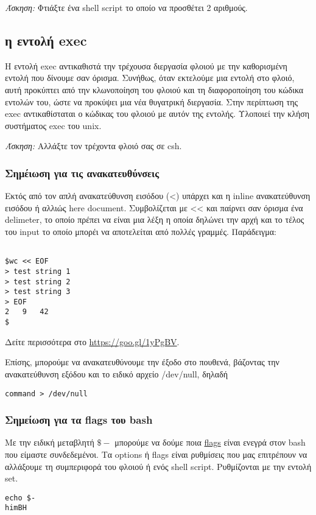 \emph{Άσκηση:} Φτιάξτε ένα shell script το οποίο να προσθέτει 2 αριθμούς.

\subsection*{η εντολή exec}

Η εντολή exec αντικαθιστά την τρέχουσα διεργασία φλοιού με την καθορισμένη εντολή που δίνουμε σαν όρισμα. Συνήθως, όταν εκτελούμε μια
εντολή στο φλοιό, αυτή προκύπτει από την κλωνοποίηση του φλοιού και τη διαφοροποίηση του κώδικα εντολών του, ώστε να προκύψει μια νέα
θυγατρική διεργασία. Στην περίπτωση της exec αντικαθίσταται ο κώδικας του φλοιού με αυτόν της εντολής. Υλοποιεί την κλήση συστήματος exec
του unix.

\emph{Άσκηση:} Αλλάξτε τον τρέχοντα φλοιό σας σε csh.

\subsubsection{Σημέιωση για τις ανακατευθύνσεις}

Εκτός από τον απλή ανακατεύθυνση εισόδου (<) υπάρχει και η inline ανακατεύθυνση εισόδου ή αλλιώς here document. Συμβολίζεται με << και παίρνει σαν όρισμα ένα delimeter, το οποίο πρέπει να είναι μια λέξη η οποία δηλώνει την αρχή και το τέλος του input το οποίο μπορέι να αποτελείται από πολλές γραμμές.
Παράδειγμα:
\begin{lstlisting}

$wc << EOF
> test string 1
> test string 2
> test string 3
> EOF
2	9	42
$
\end{lstlisting}

Δείτε περισσότερα στο \href{https://goo.gl/1yPgBV}{https://goo.gl/1yPgBV}.

Επίσης, μπορούμε να ανακατευθύνουμε την έξοδο στο πουθενά, βάζοντας την ανακατεύθυνση εξόδου και το ειδικό αρχείο /dev/null, δηλαδή 

\begin{lstlisting}
command > /dev/null
\end{lstlisting}

\subsubsection{Σημείωση για τα flags του bash}
Με την ειδική μεταβλητή $\$-$ μπορούμε να δούμε ποια \href{https://gerardnico.com/lang/bash/set}{flags} είναι ενεγρά στον bash που είμαστε συνδεδεμένοι. Τα options ή flags είναι ρυθμίσεις που μας επιτρέπουν να αλλάξουμε τη συμπεριφορά του φλοιού ή ενός shell script. Ρυθμίζονται με την εντολή set.
\begin{lstlisting}
echo $-
himBH
\end{lstlisting}

